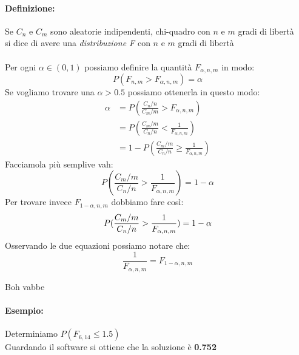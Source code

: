 \documentclass[]{article}
\begin{document}
    \paragraph{Definizione:} Se $C_n$ e $C_m$ sono aleatorie indipendenti, chi-quadro con $n$ e $m$ gradi di libertà \\
    si dice di avere una \textit{distribuzione F} con $n$ e $m$ gradi di libertà \\ \\
    Per ogni $\alpha \in (0,1)$ possiamo definire la quantità $F_{\alpha, n, m}$ in modo:
    \[ P(F_{n,m} > F_{\alpha, n, m}) = \alpha \]
    Se vogliamo trovare una $\alpha > 0.5$ possiamo ottenerla in questo modo:
    \begin{equation*}
        \begin{split}
            \alpha &= P(\frac{C_n / n}{C_m / m} > F_{\alpha, n, m}) \\
            &= P(\frac{C_m / m}{C_n / n} < \frac{1}{F_{\alpha, n ,m}}) \\
            &= 1 - P(\frac{C_m / m}{C_n / n} \geq   \frac{1}{F_{\alpha, n, m}})
        \end{split}
    \end{equation*}
    Facciamola più semplive vah:
    \[ P(\frac{C_m / m}{C_n / n} > \frac{1}{F_{\alpha, n, m}}) = 1 - \alpha \]
    Per trovare invece $F_{1-\alpha, n, m}$ dobbiamo fare così:
    \[ P(\frac{C_m / m}{C_n / n} > \frac{1}{F_{\-\alpha, n, m}}) = 1 - \alpha \]
    Osservando le due equazioni possiamo notare che:
    \[ \frac{1}{F_{\alpha,n,m}} = F_{1-\alpha,n,m} \]
    \centerline{Boh vabbe}

    \paragraph{Esempio:} Determiniamo $P(F_{6, 14} \leq 1.5)$ \\
    Guardando il software si ottiene che la soluzione è \textbf{0.752}
\end{document}
